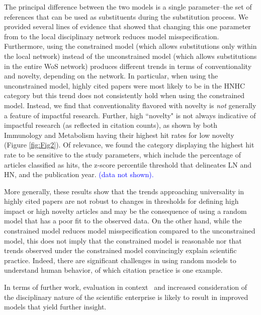\documentclass[NETN]{stjour}
\begin{document}
{The principal difference between the two models is a single parameter--the set of references that can be used as substituents during the substitution process. We provided several lines of evidence that showed that changing this one parameter from to the local disciplinary network reduces model misspecification. Furthermore,  using the constrained model (which allows substitutions only within the local network)  instead of the unconstrained model (which allows substitutions in the entire WoS network) produces different trends in terms of conventionality and novelty, depending on the network. In particular, when using the unconstrained model, highly cited papers were most likely to be
in the HNHC category but this trend does not consistently hold when using the constrained model. Instead, we find that conventionality flavored with novelty is {\em not} generally a feature of impactful research. Further,  high ``novelty" is not always indicative of impactful research (as reflected in citation counts), as shown by both Immunology and Metabolism having their highest hit rates for low novelty (Figure \ref{fig:Fig2}). Of relevance, we found the category displaying the highest hit rate to be sensitive to the study parameters, which include the percentage of articles classified as hits, the z-score percentile threshold that delineates LN and HN, and the publication year. \textcolor{blue}{(data not shown).} 

More generally, these results show that the trends approaching universality in highly cited papers are not robust to changes in thresholds for defining high impact or high novelty articles and may be the consequence of using a random model that has a poor fit to the observed data. On the other hand, while  the constrained model reduces model misspecification compared to the unconstrained model, this does not imply that the constrained model is reasonable nor that trends observed under the constrained model convincingly explain scientific practice. Indeed, there are significant  challenges in using random models to understand human behavior, of which citation practice is one example.

In terms of further work, evaluation in context~\citep{hicks_bibliometrics:_2015} and increased consideration of the disciplinary nature of the scientific enterprise is likely to result in improved models that yield further insight.

}
\end{document}
